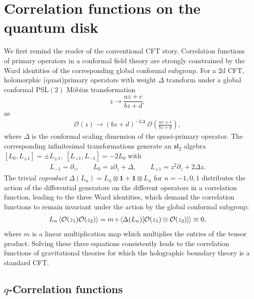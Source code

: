 \documentclass[a4paper,titlepage,12pt]{article}
\numberwithin{equation}{section}
\begin{document}
\section{Correlation functions on the quantum disk}
\label{s:qward}
We first remind the reader of the conventional CFT story. Correlation functions of primary operators in a conformal field theory are strongly constrained by the Ward identities of the corresponding global conformal subgroup. For a 2d CFT, holomorphic (quasi)primary operators with weight $\Delta$ transform under a global conformal PSL$(2)$ Möbius transformation \begin{equation}
z\rightarrow \frac{az+c}{bz+d},
\end{equation}
as
\begin{align}
\label{eq:quasiprimarytransf}
    \mathcal{O}(z)\rightarrow \left(bz+d\right)^{-2\Delta} \;\mathcal{O}\left(\frac{az+c}{bz+d}\right),
\end{align}
where $\Delta$ is the conformal scaling dimension of the quasi-primary operator. The corresponding infinitesimal transformations generate an $\mathfrak{sl}_2$ algebra $[L_0,L_{\pm1}]=\pm L_{\pm1}, \;[L_{+1},L_{-1}]=-2L_0$ with 
\begin{align}
\label{eq:infgenerators}
    L_{-1}=\partial_z, \qquad L_{0}=z\partial_z+\Delta , \qquad L_{+1}=z^2\partial_z+2\Delta z.
\end{align} 
The trivial \emph{coproduct} $\Delta(L_n)=L_n\otimes \mathbf{1}+\mathbf{1}\otimes L_n$ for $n=-1,0,1$ distributes the action of the differential generators on the different operators in a correlation function, leading to the three Ward identities, which demand the correlation functions to remain invariant under the action by the global conformal subgroup:
\begin{align}
\label{eq:distribute}
     L_n\braket{\mathcal{O}(z_1)\mathcal{O}(z_2)}=m\circ\braket{\Delta(L_n)[\mathcal{O}(z_1)\otimes\mathcal{O}(z_2)]}\equiv 0, 
\end{align}
where $m$ is a linear multiplication map which multiplies the entries of the tensor product. Solving these three equations consistently leads to the correlation functions of gravitational theories for which the holographic boundary theory is a standard CFT. 

\subsection{$q$-Correlation functions}
\end{document}
